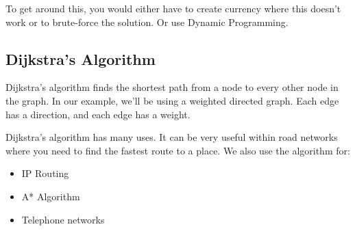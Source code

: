 \documentclass{article}
\begin{document}
To get around this, you would either have to create currency where this doesn't work or to brute-force the solution. Or use Dynamic Programming.
\newpage
\subsection{Dijkstra's Algorithm}
Dijkstra's algorithm finds the shortest path from a node to every other node in the graph. In our example, we'll be using a weighted directed graph. Each edge has a direction, and each edge has a weight.

Dijkstra's algorithm has many uses. It can be very useful within road networks where you need to find the fastest route to a place. We also use the algorithm for:
\begin{itemize}
    \item IP Routing
    \item A* Algorithm
    \item Telephone networks
\end{itemize}
\end{document}
